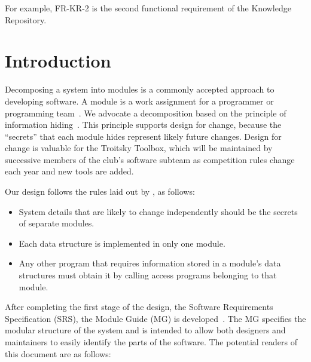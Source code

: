 \documentclass[12pt, titlepage]{article}
\begin{document}
\vspace{1em}
\noindent For example, FR-KR-2 is the second functional requirement of the Knowledge Repository.

\newpage

\tableofcontents

\listoftables

\listoffigures

\newpage


\section{Introduction}

Decomposing a system into modules is a commonly accepted approach to developing
software.  A module is a work assignment for a programmer or programming
team~\citep{ParnasEtAl1984}.  We advocate a decomposition
based on the principle of information hiding~\citep{Parnas1972a}.  This
principle supports design for change, because the ``secrets'' that each module
hides represent likely future changes.  Design for change is valuable for the
Troitsky Toolbox, which will be maintained by successive members of the club's
software subteam as competition rules change each year and new tools are added.

Our design follows the rules laid out by \citet{ParnasEtAl1984}, as follows:
\begin{itemize}
\item System details that are likely to change independently should be the
  secrets of separate modules.
\item Each data structure is implemented in only one module.
\item Any other program that requires information stored in a module's data
  structures must obtain it by calling access programs belonging to that module.
\end{itemize}

After completing the first stage of the design, the Software Requirements
Specification (SRS), the Module Guide (MG) is developed~\citep{ParnasEtAl1984}. The MG
specifies the modular structure of the system and is intended to allow both
designers and maintainers to easily identify the parts of the software.  The
potential readers of this document are as follows:
\end{document}
